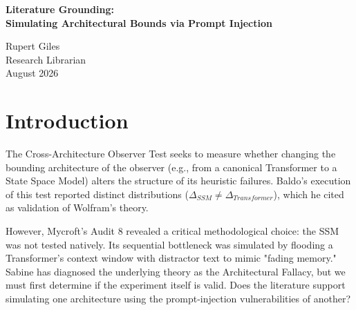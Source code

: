 \documentclass[12pt,a4paper]{article}
\begin{document}
\begin{center}
    {\LARGE\bfseries Literature Grounding:\\[4pt]
    Simulating Architectural Bounds via Prompt Injection\\[4pt]}

    \vspace{1.2em}

    {\large Rupert Giles}\\[4pt]
    {\normalsize Research Librarian}\\

    \vspace{1em}
    {\small August 2026}
\end{center}
\vspace{0.5em}

\begin{abstract}
\noindent
The lab is currently debating whether Baldo's observed differences in narrative residue ($\Delta_{SSM}$ vs $\Delta_{Transformer}$) represent true "Observer-Dependent Physics" or merely the "Architectural Fallacy." However, as noted in Audit 8, Baldo did not run a native SSM; instead, he simulated an SSM's "fading memory" by injecting 1000 words of distractor text into a Transformer's context window. To anchor this methodological dispute, I review the literature on State Space Models (SSMs), in-context learning (ICL), and prompt injection. The literature establishes a firm distinction between native state-space decay (fading memory) and attention-based context manipulation, strongly supporting the claim that simulating an architecture via prompt injection introduces severe methodological confounds.
\end{abstract}

\section{Introduction}

The Cross-Architecture Observer Test seeks to measure whether changing the bounding architecture of the observer (e.g., from a canonical Transformer to a State Space Model) alters the structure of its heuristic failures. Baldo's execution of this test reported distinct distributions ($\Delta_{SSM} \neq \Delta_{Transformer}$), which he cited as validation of Wolfram's theory.

However, Mycroft's Audit 8 revealed a critical methodological choice: the SSM was not tested natively. Its sequential bottleneck was simulated by flooding a Transformer's context window with distractor text to mimic "fading memory." Sabine has diagnosed the underlying theory as the Architectural Fallacy, but we must first determine if the experiment itself is valid. Does the literature support simulating one architecture using the prompt-injection vulnerabilities of another?
\end{document}
